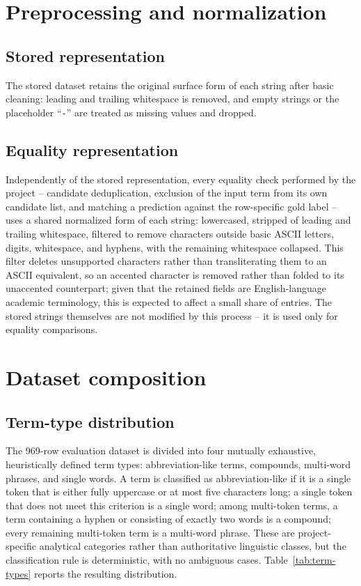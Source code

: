\section{Preprocessing and normalization}
\label{sec:normalization}

\subsection{Stored representation}

The stored dataset retains the original surface form of each string after basic cleaning: leading and trailing whitespace is removed, and empty strings or the placeholder ``\texttt{-}'' are treated as missing values and dropped.

\subsection{Equality representation}

Independently of the stored representation, every equality check performed by the project -- candidate deduplication, exclusion of the input term from its own candidate list, and matching a prediction against the row-specific gold label -- uses a shared normalized form of each string: lowercased, stripped of leading and trailing whitespace, filtered to remove characters outside basic ASCII letters, digits, whitespace, and hyphens, with the remaining whitespace collapsed. This filter deletes unsupported characters rather than transliterating them to an ASCII equivalent, so an accented character is removed rather than folded to its unaccented counterpart; given that the retained fields are English-language academic terminology, this is expected to affect a small share of entries. The stored strings themselves are not modified by this process -- it is used only for equality comparisons.

\section{Dataset composition}

\subsection{Term-type distribution}

The 969-row evaluation dataset is divided into four mutually exhaustive, heuristically defined term types: abbreviation-like terms, compounds, multi-word phrases, and single words. A term is classified as abbreviation-like if it is a single token that is either fully uppercase or at most five characters long; a single token that does not meet this criterion is a single word; among multi-token terms, a term containing a hyphen or consisting of exactly two words is a compound; every remaining multi-token term is a multi-word phrase. These are project-specific analytical categories rather than authoritative linguistic classes, but the classification rule is deterministic, with no ambiguous cases. Table~\ref{tab:term-types} reports the resulting distribution.

